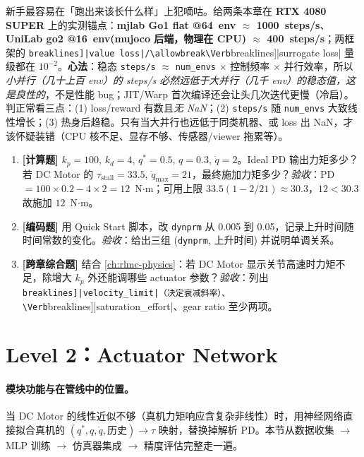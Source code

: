 \begin{insight}\label{ins:rlmc-act-sps-anchor}
新手最容易在「跑出来该长什么样」上犯嘀咕。给两条本章在 \textbf{RTX 4080 SUPER} 上的实测锚点：\textbf{mjlab Go1 flat @64~env $\approx$ 1000~steps/s}、\textbf{UniLab go2 @16~env(mujoco 后端，物理在 CPU) $\approx$ 400~steps/s}；两框架的 \Verb[breaklines]|value loss|/\allowbreak\Verb[breaklines]|surrogate loss| 量级都在 $10^{-2}$。\textbf{心法}：稳态 \verb|steps/s| $\approx$ \verb|num_envs| $\times$ 控制频率 $\times$ 并行效率，所以\emph{小并行（几十上百 env）的 steps/s 必然远低于大并行（几千 env）的稳态值，这是良性的}，不是性能 bug；JIT/Warp 首次编译还会让头几次迭代更慢（冷启）。判正常看三点：(1) loss/reward 有数且\emph{无 NaN}；(2) \verb|steps/s| 随 \verb|num_envs| 大致线性增长；(3) 热身后趋稳。只有当大并行也远低于同类机器、或 loss 出 NaN，才该怀疑装错（CPU 核不足、显存不够、传感器/viewer 拖累等）。
\end{insight}

\begin{practice}[本节练习]
\begin{enumerate}
  \item \textbf{[计算题]} $k_p=100$, $k_d=4$, $q^*=0.5$, $q=0.3$, $\dot q=2$。Ideal PD 输出力矩多少？若 DC Motor 的 $\tau_{\mathrm{stall}}=33.5$, $\dot q_{\max}=21$，最终施加力矩多少？\emph{验收}：PD $=100\times0.2-4\times2=12$~N$\cdot$m；可用上限 $33.5(1-2/21)\approx30.3$，$12<30.3$ 故施加 $12$~N$\cdot$m。
  \item \textbf{[编码题]} 用 Quick Start 脚本，改 \verb|dynprm| 从 0.005 到 0.05，记录上升时间随时间常数的变化。\emph{验收}：给出三组 (\verb|dynprm|, 上升时间) 并说明单调关系。
  \item \textbf{[跨章综合题]} 结合 \cref{ch:rlmc-physics}：若 DC Motor 显示关节高速时力矩不足，除增大 $k_p$ 外还能调哪些 actuator 参数？\emph{验收}：列出 \Verb[breaklines]|velocity_limit|（决定衰减斜率）、\Verb[breaklines]|saturation_effort|、gear ratio 至少两项。
\end{enumerate}
\end{practice}

\section{Level 2：Actuator Network}
\label{sec:rlmc-act-net}

\paragraph{模块功能与在管线中的位置。}当 DC Motor 的线性近似不够（真机力矩响应含复杂非线性）时，用神经网络直接拟合真机的 $(q^*,q,\dot q,\text{历史})\to\tau$ 映射，替换掉解析 PD。本节从数据收集 $\to$ MLP 训练 $\to$ 仿真器集成 $\to$ 精度评估完整走一遍。

